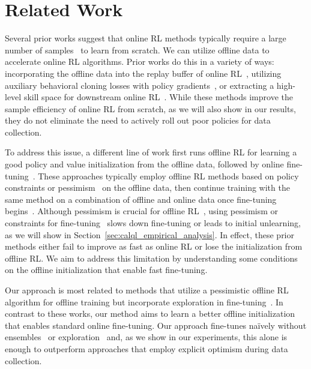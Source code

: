 \vspace{-0.2cm}
\section{Related Work}
\vspace{-0.3cm}
Several prior works suggest that online RL methods typically require a large number of samples~\cite{silver2016mastering,vinyals2019grandmaster,ye2020towards,kakade2002approximately,zhai2022computational,gupta2022unpacking,li2022understanding} to learn from scratch. We can utilize offline data to accelerate online RL algorithms. Prior works do this in a variety of ways: incorporating the offline data into the replay buffer of online RL~\cite{schaal1996learning,vecerik2017leveraging,hester2018deep,song2023hybrid}, utilizing auxiliary behavioral cloning losses with policy gradients~\cite{rajeswaran2017learning,kang2018policy,zhu2018reinforcement,zhu2019dexterous}, or extracting a high-level skill space for downstream online RL~\cite{gupta2019relay,ajay2020opal}. While these methods improve the sample efficiency of online RL from scratch, as we will also show in our results, they do not eliminate the need to actively roll out poor policies for data collection.

To address this issue, a different line of work first runs offline RL for learning a good policy and value initialization from the offline data, followed by online fine-tuning~\cite{nair2020accelerating,kostrikov2021offlineb,lyu2022mildly,beeson2022improving,wu2022supported,lee2022offline,mark2022fine}. These approaches typically employ offline RL methods based on policy constraints or pessimism~\cite{fujimoto2018off,siegel2020keep,guo2020batch,ghasemipour2021emaq,kostrikov2021offlineb,singh2020cog,lee2022offline} on the offline data, then continue training with the same method on a combination of offline and online data once fine-tuning begins~\cite{nachum2019algaedice,kidambi2020morel,yu2020mopo,kumar2020conservative,buckman2020importance}. Although pessimism is crucial for offline RL~\cite{jin2021pessimism,cheng2022adversarially}, using pessimism or constraints for fine-tuning~\cite{nair2020accelerating,kostrikov2021offlineb,lyu2022mildly} slows down fine-tuning or leads to initial unlearning, as we will show in Section~\ref{sec:calql_empirical_analysis}. In effect, these prior methods either fail to improve as fast as online RL or lose the initialization from offline RL. We aim to address this limitation by understanding some conditions on the offline initialization that enable fast fine-tuning. 

Our approach is most related to methods that utilize a pessimistic offline RL algorithm for offline training but incorporate exploration in fine-tuning~\cite{lee2022offline,mark2022fine,wu2022supported}. In contrast to these works, our method aims to learn a better offline initialization that enables standard online fine-tuning. Our approach fine-tunes na\"ively without ensembles~\cite{lee2022offline} or exploration~\cite{mark2022fine} and, as we show in our experiments, this alone is enough to outperform approaches that employ explicit optimism during data collection.